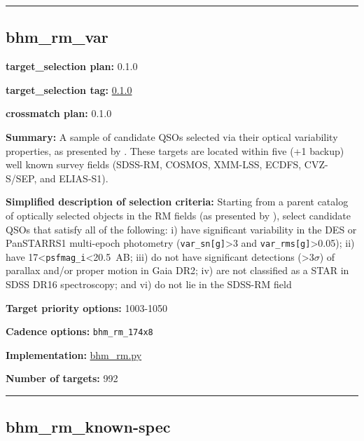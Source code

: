 \begin{center}\rule{0.5\linewidth}{0.5pt}\end{center}

\hypertarget{bhm_rm_var_plan0.1.0}{%
\subsection{bhm\_rm\_var}\label{bhm_rm_var_plan0.1.0}}

\noindent\textbf{target\_selection plan:} 0.1.0

\noindent\textbf{target\_selection tag:}
\href{https://github.com/sdss/target_selection/tree/0.1.0/}{0.1.0}

\noindent\textbf{crossmatch plan:} 0.1.0

\noindent\textbf{Summary:} A sample of candidate QSOs selected via their optical
variability properties, as presented by
\citet{Yang2022}. These targets are located within five (+1 backup) well
known survey fields (SDSS-RM, COSMOS, XMM-LSS, ECDFS, CVZ-S/SEP, and
ELIAS-S1).

\noindent\textbf{Simplified description of selection criteria:} Starting from a
parent catalog of optically selected objects in the RM fields (as
presented by
\citealt{Yang2022}), select candidate QSOs that satisfy all of the
following: i) have significant variability in the DES or PanSTARRS1
multi-epoch photometry (\texttt{var\_sn{[}g{]}}\textgreater3 and
\texttt{var\_rms{[}g{]}}\textgreater0.05); ii) have
17\textless{}\texttt{psfmag\_i}\textless20.5~AB; iii) do not have
significant detections (\textgreater3$\sigma$) of parallax and/or proper motion
in Gaia DR2; iv) are not classified as a STAR in SDSS DR16 spectroscopy;
and vi) do not lie in the SDSS-RM field


\noindent\textbf{Target priority options:} 1003-1050

\noindent\textbf{Cadence options:} \texttt{bhm\_rm\_174x8}

\noindent\textbf{Implementation:}
\href{https://github.com/sdss/target_selection/blob/0.1.0/python/target_selection/cartons/bhm_rm.py}{bhm\_rm.py}

\noindent\textbf{Number of targets:} 992

\begin{center}\rule{0.5\linewidth}{0.5pt}\end{center}

\hypertarget{bhm_rm_known-spec_plan0.1.0}{%
\subsection{bhm\_rm\_known-spec}\label{bhm_rm_known-spec_plan0.1.0}}

